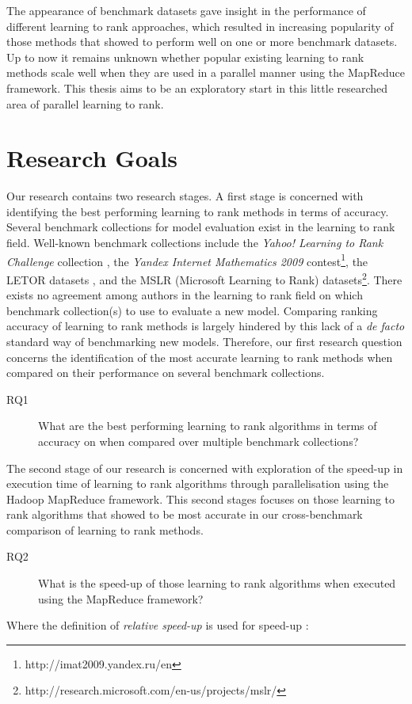 \documentclass{sig-alternate}
\begin{document}
The appearance of benchmark datasets gave insight in the performance of different learning to rank approaches, which resulted in increasing popularity of those methods that showed to perform well on one or more benchmark datasets. Up to now it remains unknown whether popular existing learning to rank methods scale well when they are used in a parallel manner using the MapReduce framework. This thesis aims to be an exploratory start in this little researched area of parallel learning to rank.\\

\section{Research Goals}
\label{sec:goals}
Our research contains two research stages. A first stage is concerned with identifying the best performing learning to rank methods in terms of accuracy. Several benchmark collections for model evaluation exist in the learning to rank field. Well-known benchmark collections include the \emph{Yahoo! Learning to Rank Challenge} collection \cite{Chapelle2011a}, the \emph{Yandex Internet Mathematics 2009} contest\footnote{http://imat2009.yandex.ru/en}, the LETOR datasets \cite{Qin2010}, and the MSLR (Microsoft Learning to Rank) datasets\footnote{http://research.microsoft.com/en-us/projects/mslr/}. There exists no agreement among authors in the learning to rank field on which benchmark collection(s) to use to evaluate a new model. Comparing ranking accuracy of learning to rank methods is largely hindered by this lack of a \emph{de facto} standard way of benchmarking new models. Therefore, our first research question concerns the identification of the most accurate learning to rank methods when compared on their performance on several benchmark collections.
\begin{description}
\item[RQ1] What are the best performing learning to rank algorithms in terms of accuracy on when compared over multiple benchmark collections?
\end{description}
The second stage of our research is concerned with exploration of the speed-up in execution time of learning to rank algorithms through parallelisation using the Hadoop MapReduce framework. This second stages focuses on those learning to rank algorithms that showed to be most accurate in our cross-benchmark comparison of learning to rank methods.
\begin{description}
\item[RQ2] What is the speed-up of those learning to rank algorithms when executed using the MapReduce framework?
\end{description}
\noindent Where the definition of \emph{relative speed-up} is used for speed-up \cite{Sun1991}:\\
\end{document}
